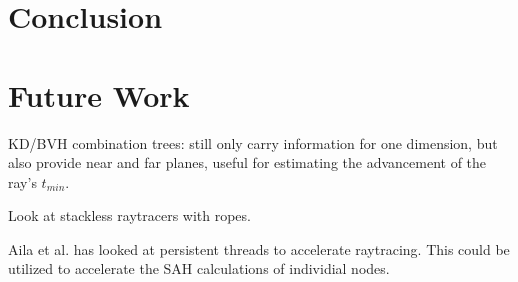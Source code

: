 







\chapter{Conclusion}


\chapter{Future Work}\label{chp:future}


KD/BVH combination trees: still only carry information for one
dimension, but also provide near and far planes, useful for estimating
the advancement of the ray's $t_{min}$.

Look at stackless raytracers with ropes.

Aila et al. has looked at persistent threads to
accelerate raytracing. This could be utilized to accelerate the SAH
calculations of individial nodes.

